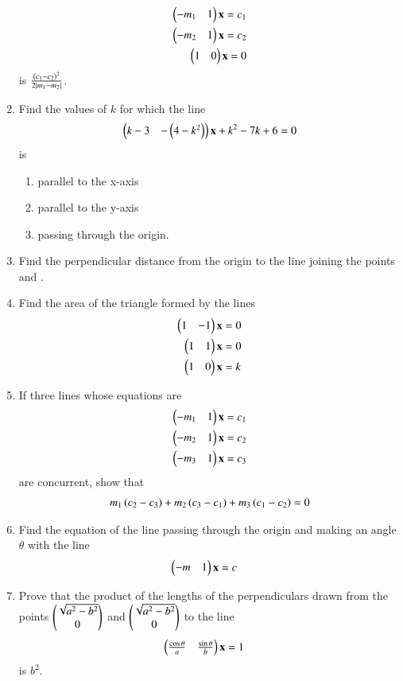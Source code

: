 \begin{enumerate}[label=\arabic*.,ref=\thesubsection.\theenumi]
\begin{align}
\begin{pmatrix}-m_1 & 1\end{pmatrix}\mathbf{x} = c_1
\\
\begin{pmatrix}-m_2 & 1\end{pmatrix}\mathbf{x} = c_2
\\
\begin{pmatrix}1 & 0\end{pmatrix}\mathbf{x} = 0
\end{align}
%
is $\frac{\left(c_1-c_2\right)^2}{2\left\vert m_1-m_2\right\vert}$.
\item Find the values of $k$ for which the line 
%
\begin{align}
\begin{pmatrix}k-3 & -\left(4-k^2\right)\end{pmatrix}\mathbf{x} +k^2-7k+6= 0
\end{align}
%
is
\begin{enumerate}
\item parallel to the x-axis
\item parallel to the y-axis
\item passing through the origin.
\end{enumerate}
%
\item Find the perpendicular distance from the origin to the line joining the points \myvec{\cos\theta\\\sin\theta} and \myvec{\cos\phi\\ \sin \phi}.
\item Find the area of the triangle formed by the lines
%
\begin{align}
\begin{pmatrix}1 & -1\end{pmatrix}\mathbf{x} &= 0
\\
\begin{pmatrix}1 & 1\end{pmatrix}\mathbf{x} &= 0
\\
\begin{pmatrix}1 & 0\end{pmatrix}\mathbf{x} &= k
\end{align}
%
\item If three lines whose equations are 
%
\begin{align}
\begin{pmatrix}-m_1 & 1\end{pmatrix}\mathbf{x} &= c_1
\\
\begin{pmatrix}-m_2 & 1\end{pmatrix}\mathbf{x} &= c_2
\\
\begin{pmatrix}-m_3 & 1\end{pmatrix}\mathbf{x} &= c_3
\end{align}
%
are concurrent, show that
%
\begin{align}
m_1\left(c_2-c_3\right)+
m_2\left(c_3-c_1\right)+
m_3\left(c_1-c_2\right) = 0
\end{align}
%
\item Find the equation of the line passing through the origin and making an angle $\theta$ with the line %
\begin{align}
\begin{pmatrix}-m & 1\end{pmatrix}\mathbf{x} &= c
\end{align}
%
\item Prove that the product of the lengths of the perpendiculars drawn from the points $\begin{pmatrix}\sqrt{a^2-b^2}\\0\end{pmatrix}$ and $\begin{pmatrix}\sqrt{a^2-b^2}\\0\end{pmatrix}$ to the line 
%
\begin{align}
\begin{pmatrix}\frac{\cos\theta}{a} & \frac{\sin\theta}{b}\end{pmatrix}\mathbf{x} &= 1
\end{align}
%
is $b^2$.


\end{enumerate}
